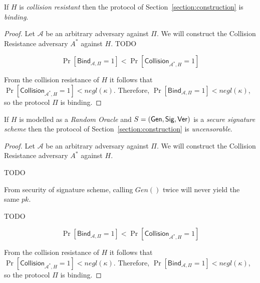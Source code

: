 \begin{theorem}[Binding]
  If $H$ is \emph{collision resistant} then the protocol of Section~\ref{section:construction} is \emph{binding}.
\end{theorem}
\begin{proof}
  Let $\mathcal{A}$ be an arbitrary adversary against $\Pi$.
  We will construct the Collision Resistance adversary $A^*$ against $H$.
  TODO

  \[
    \Pr[\textsf{Bind}_{\mathcal{A},\Pi} = 1]
    <
    \Pr[\textsf{Collision}_{\mathcal{A}^*,H} = 1]
  \]

  From the collision resistance of $H$ it follows that $\Pr[\textsf{Collision}_{\mathcal{A}^*,H} = 1] < negl(\kappa)$. Therefore,
  $\Pr[\textsf{Bind}_{\mathcal{A},\Pi} = 1] < negl(\kappa)$, so
  the protocol $\Pi$ is binding.
\end{proof}

\begin{theorem}
  If $H$ is modelled as a \emph{Random Oracle} and $S = (\mathsf{Gen}, \mathsf{Sig}, \mathsf{Ver})$ is a \emph{secure signature scheme} then the protocol of Section~\ref{section:construction} is \emph{uncensorable}.
\end{theorem}
\begin{proof}
  Let $\mathcal{A}$ be an arbitrary adversary against $\Pi$.
  We will construct the Collision Resistance adversary $A^*$ against $H$.

  TODO

  From security of signature scheme, calling $Gen()$ twice will never yield the same $pk$.

  TODO

  \[
    \Pr[\textsf{Bind}_{\mathcal{A},\Pi} = 1]
    <
    \Pr[\textsf{Collision}_{\mathcal{A}^*,H} = 1]
  \]

  From the collision resistance of $H$ it follows that $\Pr[\textsf{Collision}_{\mathcal{A}^*,H} = 1] < negl(\kappa)$. Therefore,
  $\Pr[\textsf{Bind}_{\mathcal{A},\Pi} = 1] < negl(\kappa)$, so
  the protocol $\Pi$ is binding.
\end{proof}

